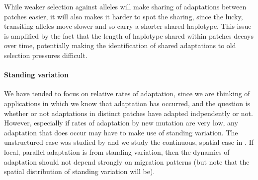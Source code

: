 \documentclass{article}
\newcommand{\plr}[1]{{\it\color{blue}(#1)}}
\begin{document}
While weaker selection against alleles will make sharing of
adaptations between patches easier, 
it will also makes it harder to spot the sharing,
since the lucky, transiting alleles move slower and so carry a shorter
shared haplotype.
This issue is amplified by the fact that the length of haplotype
shared within patches decays over time, potentially making the
identification of shared adaptations to old selection pressures difficult.





\paragraph{Standing variation} 
We have tended to focus on relative rates of adaptation,
since we are thinking of applications in which we know that adaptation has occurred,
and the question is whether or not adaptations in distinct patches
have adapted indpendently or not.
However, especially if rates of adaptation by new mutation are very low,
any adaptation that does occur may have to make use of standing variation.
The unstructured case was studied by \citet{softsweepsI}
and we study the continuous, spatial case in \citet{toappear}.
If local, parallel adaptation is from standing variation,
then the dynamics of adaptation should not depend strongly on migration patterns
(but note that the spatial distribution of standing variation will be).
\end{document}
